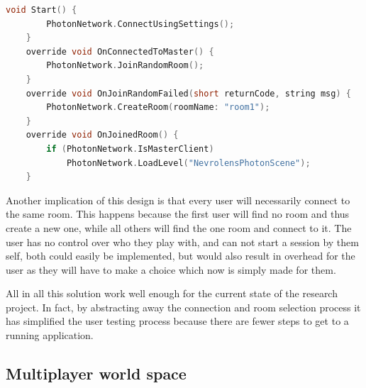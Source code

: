 \begin{lstlisting}[language=c, label={item:photonconnect}, caption={The connect process in a Unity \texttt{MonoBehaviour} written in C\#. }]
    void Start() {
        PhotonNetwork.ConnectUsingSettings();
    }
    override void OnConnectedToMaster() {
        PhotonNetwork.JoinRandomRoom(); 
    }
    override void OnJoinRandomFailed(short returnCode, string msg) {
        PhotonNetwork.CreateRoom(roomName: "room1"); 
    }
    override void OnJoinedRoom() {
        if (PhotonNetwork.IsMasterClient)
            PhotonNetwork.LoadLevel("NevrolensPhotonScene");
    }
\end{lstlisting}

Another implication of this design is that every user will necessarily connect to the same room. This happens because the first user will find no room and thus create a new one, while all others will find the one room and connect to it. The user has no control over who they play with, and can not start a session by them self, both could easily be implemented, but would also result in overhead for the user as they will have to make a choice which now is simply made for them.

All in all this solution work well enough for the current state of the research project. In fact, by abstracting away the connection and room selection process it has simplified the user testing process because there are fewer steps to get to a running application. 


\subsection*{Multiplayer world space}

